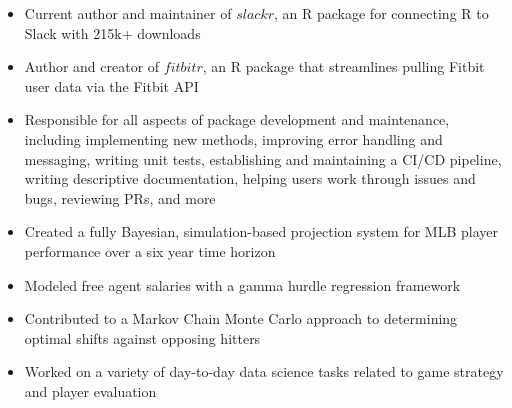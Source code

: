 \documentclass[10pt,a4paper,ragged2e,withhyper]{/Users/matt/documents/GitHub/mrkaye97.github.io/resume/altacv}
\begin{document}
		\begin{itemize}
		\item Current author and maintainer of $slackr$, an R package for connecting R to Slack with 215k+ downloads
		\item Author and creator of $fitbitr$, an R package that streamlines pulling Fitbit user data via the Fitbit API
		\item Responsible for all aspects of package development and maintenance, including implementing new methods, improving error handling and messaging, writing unit tests, establishing and maintaining a CI/CD pipeline, writing descriptive documentation, helping users work through issues and bugs, reviewing PRs, and more
		\end{itemize}
		
		\divider

		\begin{itemize}
		\item Created a fully Bayesian, simulation-based projection system for MLB player performance over a six year time horizon
		\item Modeled free agent salaries with a gamma hurdle regression framework
		\item Contributed to a Markov Chain Monte Carlo approach to determining optimal shifts against opposing hitters
		\item Worked on a variety of day-to-day data science tasks related to game strategy and player evaluation
		\end{itemize}
\end{document}
